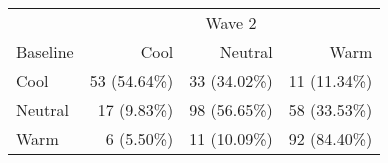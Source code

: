 \begingroup
\fontsize{12.0pt}{14.4pt}\selectfont
\begin{longtable}{lrrr}
\toprule
 & \multicolumn{3}{c}{Wave 2} \\ 
\cmidrule(lr){2-4}
Baseline & Cool & Neutral & Warm \\ 
\midrule\addlinespace[2.5pt]
Cool & 53 (54.64\%) & 33 (34.02\%) & 11 (11.34\%) \\ 
Neutral & 17 (9.83\%) & 98 (56.65\%) & 58 (33.53\%) \\ 
Warm & 6 (5.50\%) & 11 (10.09\%) & 92 (84.40\%) \\ 
\bottomrule
\end{longtable}
\endgroup

